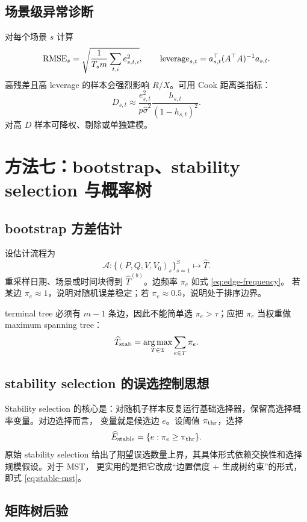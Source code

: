 \documentclass[UTF8,11pt]{ctexart}
\newcommand{\argmax}{\operatorname*{arg\,max}}
\begin{document}
\subsection{场景级异常诊断}

对每个场景 $s$ 计算
\[
    {\rm RMSE}_s=\sqrt{\frac{1}{T_sm}\sum_{t,i}e_{s,t,i}^2},
\qquad
    {\rm leverage}_{s,t}=a_{s,t}^\top(A^\top A)^{-1}a_{s,t}.
\]
高残差且高 leverage 的样本会强烈影响 $R/X$。可用 Cook 距离类指标：
\begin{equation}
    D_{s,t}\approx
    \frac{e_{s,t}^2}{p\widehat\sigma^2}
    \frac{h_{s,t}}{(1-h_{s,t})^2}.
    \label{eq:cook}
\end{equation}
对高 $D$ 样本可降权、剔除或单独建模。

\section{方法七：bootstrap、stability selection 与概率树}

\subsection{bootstrap 方差估计}

设估计流程为
\[
    \mathcal{A}:\{(P,Q,V,V_0)_s\}_{s=1}^S\mapsto \widehat T.
\]
重采样日期、场景或时间块得到 $\widehat T^{(b)}$。边频率 $\pi_e$ 如式 \eqref{eq:edge-frequency}。
若某边 $\pi_e\approx1$，说明对随机误差稳定；若 $\pi_e\approx0.5$，说明处于排序边界。

terminal tree 必须有 $m-1$ 条边，因此不能简单选 $\pi_e>\tau$；应把 $\pi_e$ 当权重做 maximum spanning tree：
\[
    \widehat T_{\rm stab}=\argmax_{T\in\mathfrak{T}}\sum_{e\in T}\pi_e.
    \label{eq:stable-mst}
\]

\subsection{stability selection 的误选控制思想}

Stability selection 的核心是：对随机子样本反复运行基础选择器，保留高选择概率变量。对边选择而言，
变量就是候选边 $e$。设阈值 $\pi_{\rm thr}$，选择
\[
    \widehat E_{\rm stable}=\{e:\pi_e\ge\pi_{\rm thr}\}.
\]
原始 stability selection 给出了期望误选数量上界，其具体形式依赖交换性和选择规模假设。对于 MST，
更实用的是把它改成“边置信度 + 生成树约束”的形式，即式 \eqref{eq:stable-mst}。

\subsection{矩阵树后验}
\end{document}
